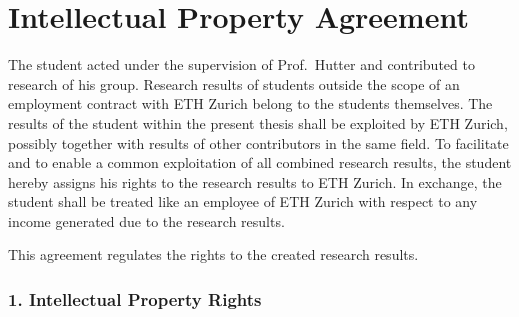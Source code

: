 
\section*{Intellectual Property Agreement}


The student acted under the supervision of Prof.\ Hutter and contributed to research of his group.
Research results of students outside the scope of an employment contract with ETH Zurich belong to the students themselves.
The results of the student within the present thesis shall be exploited by ETH Zurich, possibly together with results of other contributors in the same field.
To facilitate and to enable a common exploitation of all combined research results, the student hereby assigns his rights to the research results to ETH Zurich.
In exchange, the student shall be treated like an employee of ETH Zurich with respect to any income generated due to the research results.

This agreement regulates the rights to the created research results.



\subsubsection*{1. Intellectual Property Rights}

